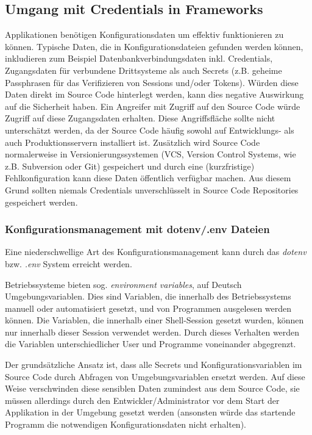 \subsection{Umgang mit Credentials in Frameworks}

Applikationen benötigen Konfigurationsdaten um effektiv funktionieren zu können. Typische Daten, die in Konfigurationsdateien gefunden werden können, inkludieren zum Beispiel Datenbankverbindungsdaten inkl. Credentials, Zugangsdaten für verbundene Drittsysteme als auch Secrets (z.B. geheime Passphrasen für das Verifizieren von Sessions und/oder Tokens). Würden diese Daten direkt im Source Code hinterlegt werden, kann dies negative Auswirkung auf die Sicherheit haben. Ein Angreifer mit Zugriff auf den Source Code würde Zugriff auf diese Zugangsdaten erhalten. Diese Angriffsfläche sollte nicht unterschätzt werden, da der Source Code häufig sowohl auf Entwicklungs- als auch Produktionsservern installiert ist. Zusätzlich wird Source Code normalerweise in Versionierungssystemen (VCS, Version Control Systems, wie z.B. Subversion oder Git) gespeichert und durch eine (kurzfristige) Fehlkonfiguration kann diese Daten öffentlich verfügbar machen. Aus diesem Grund sollten niemals Credentials unverschlüsselt in Source Code Repositories gespeichert werden.

\subsubsection{Konfigurationsmanagement mit dotenv/.env Dateien}

Eine niederschwellige Art des Konfigurationsmanagement kann durch das \textit{dotenv} bzw. \textit{.env} System erreicht werden.

Betriebssysteme bieten sog. \textit{environment variables}, auf Deutsch Umgebungsvariablen. Dies sind Variablen, die innerhalb des Betriebssystems manuell oder automatisiert gesetzt, und von Programmen ausgelesen werden können. Die Variablen, die innerhalb einer Shell-Session gesetzt wurden, können nur innerhalb dieser Session verwendet werden. Durch dieses Verhalten werden die Variablen unterschiedlicher User und Programme voneinander abgegrenzt.

Der grundsätzliche Ansatz ist, dass alle Secrets und Konfigurationsvariablen im Source Code durch Abfragen von Umgebungsvariablen ersetzt werden. Auf diese Weise verschwinden diese sensiblen Daten zumindest aus dem Source Code, sie müssen allerdings durch den Entwickler/Administrator vor dem Start der Applikation in der Umgebung gesetzt werden (ansonsten würde das startende Programm die notwendigen Konfigurationsdaten nicht erhalten).

